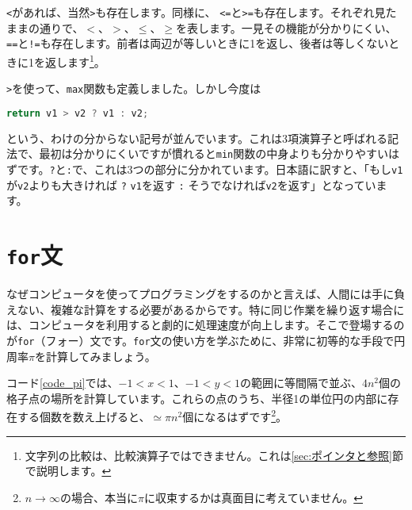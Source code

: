 \texttt{<}があれば、当然\texttt{>}も存在します。同様に、 \texttt{<=}と\texttt{>=}も存在します。それぞれ見たままの通りで、$<$、$>$、$\le$、$\ge$を表します。一見その機能が分かりにくい、\texttt{==}と\texttt{!=}も存在します。前者は両辺が等しいときに1を返し、後者は等しくないときに1を返します\footnote{文字列の比較は、比較演算子ではできません。これは\ref{sec:ポインタと参照}節で説明します。}。

\texttt{>}を使って、\texttt{max}関数も定義しました。しかし今度は
\begin{lstlisting}[language=c++]
  return v1 > v2 ? v1 : v2;
\end{lstlisting}
という、わけの分からない記号が並んでいます。これは3項演算子と呼ばれる記法で、最初は分かりにくいですが慣れると\texttt{min}関数の中身よりも分かりやすいはずです。\texttt{?}と\texttt{:}で、これは3つの部分に分かれています。日本語に訳すと、「もし\texttt{v1}が\texttt{v2}よりも大きければ \texttt{?} \texttt{v1}を返す \texttt{:} そうでなければ\texttt{v2}を返す」となっています。

\section{\texttt{for}文}

なぜコンピュータを使ってプログラミングをするのかと言えば、人間には手に負えない、複雑な計算をする必要があるからです。特に同じ作業を繰り返す場合には、コンピュータを利用すると劇的に処理速度が向上します。そこで登場するのが\texttt{for}（フォー）文です。\texttt{for}文の使い方を学ぶために、非常に初等的な手段で円周率$\pi$を計算してみましょう。



コード\ref{code_pi}では、$-1<x<1$、$-1<y<1$の範囲に等間隔で並ぶ、$4n^2$個の格子点の場所を計算しています。これらの点のうち、半径1の単位円の内部に存在する個数を数え上げると、$\simeq\pi n^2$個になるはずです\footnote{$n\rightarrow\infty$の場合、本当に$\pi$に収束するかは真面目に考えていません。}。


